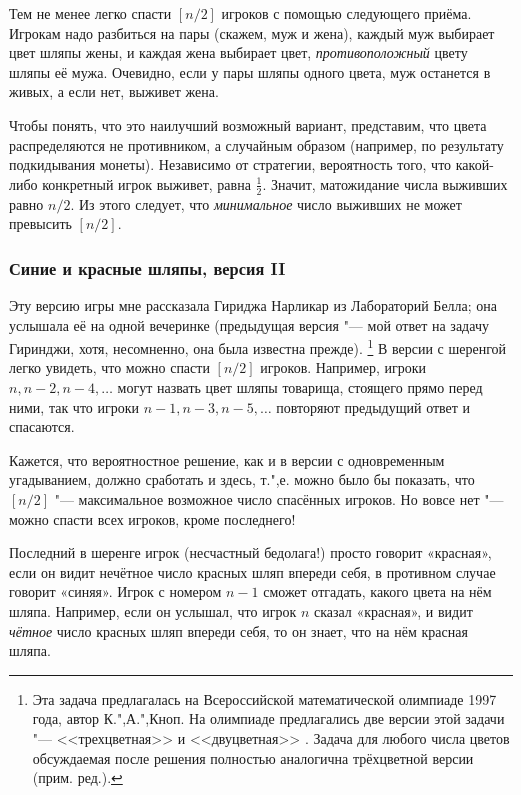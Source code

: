 \documentclass[twoside]{book}
\begin{document}
\medskip

Тем не менее легко спасти $[n/2]$ игроков с помощью следующего приёма.
Игрокам надо разбиться на пары (скажем, муж и жена), каждый муж выбирает цвет шляпы жены, и каждая жена выбирает цвет, \emph{противоположный} цвету шляпы её мужа.
Очевидно, если у пары шляпы одного цвета, муж останется в живых, а если нет, выживет жена.

Чтобы понять, что это наилучший возможный вариант, представим, что цвета распределяются не противником, а случайным образом 
(например, по результату подкидывания монеты).
Независимо от стратегии, вероятность того, что какой-либо конкретный игрок выживет, равна $\tfrac12$.
Значит, матожидание числа выживших равно $n/2$. 
Из этого следует, что \emph{минимальное} число выживших не может превысить $[n/2]$.\heart

\subsubsection*{Синие и красные шляпы, версия II}%

Эту версию игры мне рассказала Гириджа Нарликар из Лабораторий Белла; %
она услышала её на одной вечеринке (предыдущая версия "--- мой ответ на задачу Гиринджи, хотя, несомненно, она была известна прежде).%
\footnote{Эта задача предлагалась на Всероссийской математической олимпиаде 1997 года, автор  К.",А.",Кноп. 
На олимпиаде предлагались две версии этой задачи "--- <<трехцветная>> и <<двуцветная>> \cite[№ 524 и № 538]{ВсеРос2007}. 
Задача для любого числа цветов обсуждаемая после решения полностью аналогична трёхцветной версии (прим. ред.).}
В версии с шеренгой легко увидеть, что можно спасти $[n/2]$ игроков.
Например, игроки $n, n-2, n-4,\dots$
могут назвать цвет шляпы товарища, стоящего прямо перед ними, так что игроки $n-1, n-3,n-5,\dots$
повторяют предыдущий ответ и спасаются.

\medskip

Кажется, что вероятностное решение, как и в версии с одновременным угадыванием, должно сработать и здесь, т.",е. можно было бы показать, что $[n/2]$ "--- максимальное возможное число спасённых игроков.  
Но вовсе нет "--- можно спасти всех игроков, кроме последнего!

Последний в шеренге игрок (несчастный бедолага!) просто говорит
«красная», если он видит нечётное число красных шляп впереди себя, в противном случае говорит «синяя».
Игрок с номером $n-1$ сможет отгадать, какого цвета на нём шляпа.
Например, если он услышал, что игрок $n$ сказал
«красная», и видит \emph{чётное} число красных шляп впереди себя, то он знает, что на нём красная шляпа.
\end{document}

